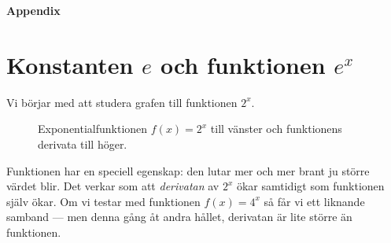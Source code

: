 \documentclass[a4paper, 12pt]{article}
\begin{document}
\newpage

\Huge{\textbf{Appendix}}
\normalsize
\appendix

\section{Konstanten $e$ och funktionen $e^x$} 
\label{app:e}
Vi börjar med att studera grafen till funktionen $2^x$.

\begin{figure}[h!]
    \centering
    \begin{mdframed}[backgroundcolor=gray!10]
        \hskip 5pt
        \caption{Exponentialfunktionen $f(x) = 2^x$ till vänster och funktionens derivata till höger.}
        \label{fig:2^x}
        
    \end{mdframed}
\end{figure}

Funktionen har en speciell egenskap: den lutar mer och mer brant ju större värdet blir. Det verkar som att \emph{derivatan} av $2^x$ ökar samtidigt som funktionen själv ökar. Om vi testar med funktionen $f(x) = 4^x$ så får vi ett liknande samband --- men denna gång åt andra hållet, derivatan är lite större än funktionen.
\end{document}
